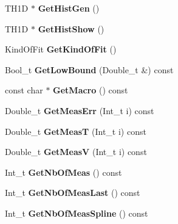 \begin{DoxyCompactItemize}
\item 
\hypertarget{classTSplineFit_a820f3208fdc14419dc651018b3f8341f}{
TH1D $\ast$ {\bfseries GetHistGen} ()}
\label{classTSplineFit_a820f3208fdc14419dc651018b3f8341f}

\item 
\hypertarget{classTSplineFit_ac914b6b4a3bede53e1989e70a910d703}{
TH1D $\ast$ {\bfseries GetHistShow} ()}
\label{classTSplineFit_ac914b6b4a3bede53e1989e70a910d703}

\item 
\hypertarget{classTSplineFit_a82a16cf72c9074dfe6a924c3aa5a6340}{
KindOfFit {\bfseries GetKindOfFit} ()}
\label{classTSplineFit_a82a16cf72c9074dfe6a924c3aa5a6340}

\item 
\hypertarget{classTSplineFit_a10613c9010c8bd8a111eacb519add2d5}{
Bool\_\-t {\bfseries GetLowBound} (Double\_\-t \&) const }
\label{classTSplineFit_a10613c9010c8bd8a111eacb519add2d5}

\item 
\hypertarget{classTSplineFit_aa449bda774d67ef1fdaebff5757885a5}{
const char $\ast$ {\bfseries GetMacro} () const }
\label{classTSplineFit_aa449bda774d67ef1fdaebff5757885a5}

\item 
\hypertarget{classTSplineFit_a5777e2a131c9bb3c39c4421c45620f44}{
Double\_\-t {\bfseries GetMeasErr} (Int\_\-t i) const }
\label{classTSplineFit_a5777e2a131c9bb3c39c4421c45620f44}

\item 
\hypertarget{classTSplineFit_a7173a0d1a487120d857de92a5e4ffd02}{
Double\_\-t {\bfseries GetMeasT} (Int\_\-t i) const }
\label{classTSplineFit_a7173a0d1a487120d857de92a5e4ffd02}

\item 
\hypertarget{classTSplineFit_ac27dcd985ce537cbd87fe041328c18ea}{
Double\_\-t {\bfseries GetMeasV} (Int\_\-t i) const }
\label{classTSplineFit_ac27dcd985ce537cbd87fe041328c18ea}

\item 
\hypertarget{classTSplineFit_ac3b068e4d4dca5f5cf104f0a748290c4}{
Int\_\-t {\bfseries GetNbOfMeas} () const }
\label{classTSplineFit_ac3b068e4d4dca5f5cf104f0a748290c4}

\item 
\hypertarget{classTSplineFit_a68f9f91f3f6d69ee5e89ae5c34bac225}{
Int\_\-t {\bfseries GetNbOfMeasLast} () const }
\label{classTSplineFit_a68f9f91f3f6d69ee5e89ae5c34bac225}

\item 
\hypertarget{classTSplineFit_afef352271be947e5eb7b61061a89f534}{
Int\_\-t {\bfseries GetNbOfMeasSpline} () const }
\label{classTSplineFit_afef352271be947e5eb7b61061a89f534}


\end{DoxyCompactItemize}
